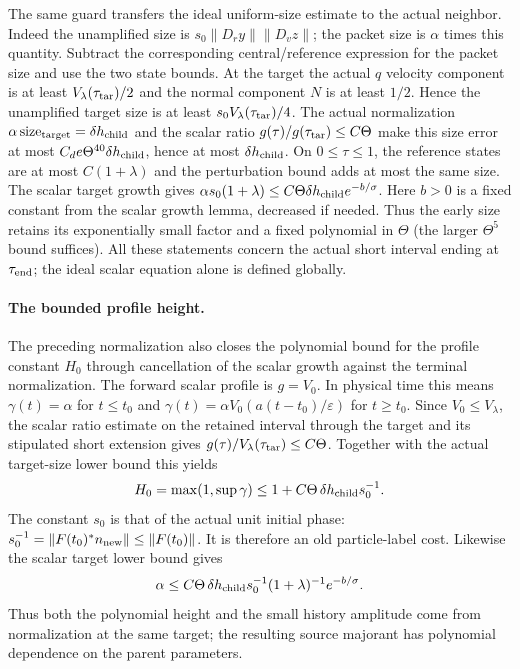 The same guard transfers the ideal uniform-size estimate to the actual
neighbor. Indeed the unamplified size is
$s_0\|D_ry\|\|D_vz\|$; the packet size is $\alpha$ times this quantity.
Subtract the corresponding central/reference expression for the packet size and use the
two state bounds. At the target the actual $q$ velocity component is at least
$V_\lambda(\tau_{\rm tar})/2$ and the normal component $N$ is at least
$1/2$. Hence the unamplified target size is at least
$s_0V_\lambda(\tau_{\rm tar})/4$.
The actual normalization $\alpha\,\mathrm{size}_{\rm target}
=\delta h_{\rm child}$ and the scalar ratio
$g(\tau)/g(\tau_{\rm tar})\leq C\Theta$ make this size error at most
$C_de\Theta^{40}\delta h_{\rm child}$, hence at most
$\delta h_{\rm child}$.
On $0\leq\tau\leq1$, the reference states are at most $C(1+\lambda)$
and the perturbation bound adds at most the same size.
The scalar target growth gives
$\alpha s_0(1+\lambda)\leq
 C\Theta\delta h_{\rm child}e^{-b/\sigma}$.
Here $b>0$ is a fixed constant from the scalar growth lemma, decreased
if needed. Thus the early size retains its exponentially small factor and a
fixed polynomial in $\Theta$ (the larger $\Theta^5$ bound suffices).
All these statements concern the actual short interval ending at
$\tau_{\rm end}$; the ideal scalar equation alone is defined globally.

\paragraph{The bounded profile height.}
The preceding normalization also closes the polynomial bound for the
profile constant $H_0$ through cancellation of the scalar growth
against the terminal normalization.
The forward scalar profile is $g=V_0$. In physical time this means
$\gamma(t)=\alpha$ for $t\leq t_0$ and
$\gamma(t)=\alpha V_0(a(t-t_0)/\varepsilon)$ for $t\geq t_0$.
Since $V_0\leq V_\lambda$,
the scalar ratio estimate on the retained interval through the target
and its stipulated short extension gives
$g(\tau)/V_\lambda(\tau_{\rm tar})\leq C\Theta$.
Together with the actual target-size lower bound this yields
\begin{equation}\label{eq:actual-profile-height}
 H_0=\max(1,\sup\gamma)
 \leq1+C\Theta\,\delta h_{\rm child}s_0^{-1}.
\end{equation}
The constant $s_0$ is that of the actual unit initial phase:
$s_0^{-1}=\|F(t_0)^*n_{\rm new}\|\leq\|F(t_0)\|$.
It is therefore an old particle-label cost.
Likewise the scalar target lower bound gives
\[
 \alpha\leq
 C\Theta\,\delta h_{\rm child}s_0^{-1}
              (1+\lambda)^{-1}e^{-b/\sigma}.
\]
Thus both the polynomial height and the small history amplitude come
from normalization at the same target; the resulting source majorant
has polynomial dependence on the parent parameters.

